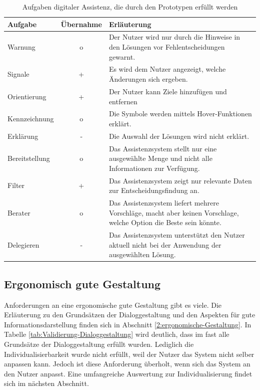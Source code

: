 \begin{table}[htb]
\caption{Aufgaben digitaler Assistenz, die durch den Prototypen erfüllt werden}
\centering
\begin{tabular}{l|c|p{}}
\textbf{Aufgabe} & \textbf{Übernahme} & \textbf{Erläuterung} \\
\hline
Warnung & o & Der Nutzer wird nur durch die Hinweise in den Lösungen vor Fehlentscheidungen gewarnt.\\
\hline
Signale & + & Es wird dem Nutzer angezeigt, welche Änderungen sich ergeben.\\
\hline
Orientierung & + & Der Nutzer kann Ziele hinzufügen und entfernen \\
\hline
Kennzeichnung & o & Die Symbole werden mittels Hover-Funktionen erklärt.\\
\hline
Erklärung & - & Die Auswahl der Lösungen wird nicht erklärt.\\
\hline
Bereitstellung & o & Das Assistenzsystem stellt nur eine ausgewählte Menge und nicht alle Informationen zur Verfügung.\\
\hline
Filter & + & Das Assistenzsystem zeigt nur relevante Daten zur Entscheidungsfindung an.\\
\hline
Berater & o & Das Assistenzsystem liefert mehrere Vorschläge, macht aber keinen Vorschlage, welche Option die Beste sein könnte. \\
\hline
Delegieren & - & Das Assistenzsystem unterstützt den Nutzer aktuell nicht bei der Anwendung der ausgewählten Lösung.\\
\end{tabular}
\label{tab:Aufgaben-Assistenz-Prototyp}
\end{table}

\subsection*{Ergonomisch gute Gestaltung}
Anforderungen an eine ergonomische gute Gestaltung gibt es viele. Die Erläuterung zu den Grundsätzen der Dialoggestaltung und den Aspekten für gute Informationsdarstellung finden sich in Abschnitt \ref{2:ergonomische-Gestaltung}. In Tabelle \ref{tab:Validierung-Dialoggestaltung} wird deutlich, dass im fast alle Grundsätze der Dialoggestaltung erfüllt wurden. Lediglich die Individualisierbarkeit wurde nicht erfüllt, weil der Nutzer das System nicht selber anpassen kann. Jedoch ist diese Anforderung überholt, wenn sich das System an den Nutzer anpasst. Eine umfangreiche Auswertung zur Individualisierung findet sich im nächsten Abschnitt.


